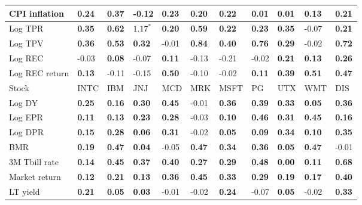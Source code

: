 \begin{table}[h!]
{\begin{center}
\begin{tabularx}{1\textwidth}{@{}X@{\hspace{0.2cm}}l@{\hspace{0.2cm}}l@{\hspace{0.2cm}}l@{\hspace{0.2cm}}l@{\hspace{0.2cm}}l@{\hspace{0.2cm}}l@{\hspace{0.2cm}}l@{\hspace{0.2cm}}l@{\hspace{0.2cm}}l@{\hspace{0.2cm}}l@{}}
 CPI inflation  & \textbf{0.24}	 & \textbf{0.37}	 & -0.12	 & \textbf{0.23}	 & \textbf{0.20}	 & \textbf{0.22}	 & \textbf{0.01}	 & \textbf{0.01}	 & \textbf{0.13}	 & \textbf{0.21}	\\
\midrule
 Log TPR  & \textbf{0.35}	 & \textbf{0.62}	 & $\mathbf{1.17^{*}}$	 & \textbf{0.20}	 & \textbf{0.59}	 & \textbf{0.22}	 & \textbf{0.23}	 & \textbf{0.35}	 & -0.07	 & \textbf{0.21}	\\
 Log TPV  & \textbf{0.36}	 & \textbf{0.53}	 & \textbf{0.32}	 & -0.01	 & \textbf{0.84}	 & \textbf{0.40}	 & \textbf{0.76}	 & \textbf{0.29}	 & -0.02	 & \textbf{0.72}	\\
 Log REC  & -0.03	 & \textbf{0.08}	 & -0.07	 & \textbf{0.11}	 & -0.13	 & -0.21	 & -0.02	 & \textbf{0.21}	 & \textbf{0.13}	 & \textbf{0.26}	\\
 Log REC return  & \textbf{0.13}	 & -0.11	 & -0.15	 & \textbf{0.50}	 & -0.10	 & -0.02	 & \textbf{0.11}	 & \textbf{0.39}	 & \textbf{0.51}	 & \textbf{0.47}	\\
\midrule
\midrule
 Stock  & INTC	 & IBM	 & JNJ	 & MCD	 & MRK	 & MSFT	 & PG	 & UTX	 & WMT	 & DIS	\\
\midrule
 Log DY  & \textbf{0.25}	 & \textbf{0.16}	 & \textbf{0.30}	 & \textbf{0.45}	 & -0.01	 & \textbf{0.36}	 & \textbf{0.39}	 & \textbf{0.33}	 & \textbf{0.05}	 & \textbf{0.36}	\\
 Log EPR  & \textbf{0.11}	 & \textbf{0.13}	 & \textbf{0.23}	 & \textbf{0.28}	 & -0.03	 & \textbf{0.10}	 & \textbf{0.46}	 & \textbf{0.31}	 & \textbf{0.45}	 & \textbf{0.16}	\\
 Log DPR  & \textbf{0.15}	 & \textbf{0.28}	 & \textbf{0.06}	 & \textbf{0.31}	 & -0.02	 & \textbf{0.05}	 & \textbf{0.09}	 & \textbf{0.34}	 & \textbf{0.10}	 & \textbf{0.35}	\\
 BMR  & \textbf{0.19}	 & \textbf{0.47}	 & \textbf{0.04}	 & -0.05	 & \textbf{0.47}	 & \textbf{0.34}	 & \textbf{0.36}	 & \textbf{0.05}	 & \textbf{0.47}	 & -0.01	\\
\midrule
 3M Tbill rate  & \textbf{0.14}	 & \textbf{0.45}	 & \textbf{0.37}	 & \textbf{0.40}	 & \textbf{0.27}	 & \textbf{0.29}	 & \textbf{0.48}	 & \textbf{0.00}	 & \textbf{0.11}	 & \textbf{0.68}	\\
 Market return  & \textbf{0.12}	 & \textbf{0.21}	 & \textbf{0.13}	 & \textbf{0.36}	 & \textbf{0.45}	 & \textbf{0.33}	 & \textbf{0.29}	 & \textbf{0.19}	 & \textbf{0.17}	 & \textbf{0.40}	\\
 LT yield  & \textbf{0.21}	 & \textbf{0.05}	 & \textbf{0.03}	 & -0.01	 & -0.02	 & \textbf{0.24}	 & -0.07	 & \textbf{0.05}	 & -0.02	 & \textbf{0.33}	\\

\end{tabularx}
\end{center}}
\end{table}

